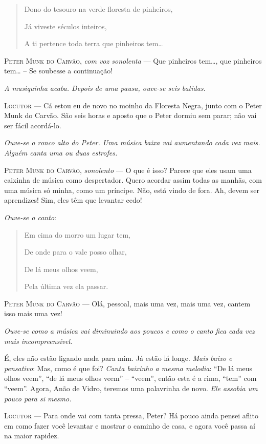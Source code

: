 \begin{myparindent}{0pt}
\begin{Parskip}
\begin{quote}
Dono do tesouro na verde floresta de pinheiros,

Já viveste séculos inteiros,

A ti pertence toda terra que pinheiros tem\ldots{}
\end{quote}

\textsc{Peter Munk do Carvão}, \emph{com voz sonolenta} --- Que pinheiros
tem\ldots{}, que pinheiros tem\ldots{} -- Se soubesse a continuação!

\emph{A musiquinha acaba. Depois de uma pausa, ouve-se seis batidas.}

\textsc{Locutor} --- Cá estou eu de novo no moinho da Floresta Negra, junto com o
Peter Munk do Carvão. São seis horas e aposto que o Peter dormiu sem
parar; não vai ser fácil acordá-lo.

\emph{Ouve-se o ronco alto do Peter. Uma música baixa vai aumentando
cada vez mais. Alguém canta uma ou duas estrofes.}

\textsc{Peter Munk do Carvão}, \emph{sonolento} --- O que é isso? Parece que eles
usam uma caixinha de música como despertador. Quero acordar assim todas
as manhãs, com uma música só minha, como um príncipe. Não, está vindo de
fora. Ah, devem ser aprendizes! Sim, eles têm que levantar cedo!

\emph{Ouve-se o canto}:

\begin{quote}
Em cima do morro um lugar tem,

De onde para o vale posso olhar,

De lá meus olhos veem,

Pela última vez ela passar.
\end{quote}

\textsc{Peter Munk do Carvão} --- Olá, pessoal, mais uma vez, mais uma vez, cantem
isso mais uma vez!

\emph{Ouve-se como a música vai diminuindo aos poucos e como o canto
fica cada vez mais incompreensível.}

É, eles não estão ligando nada para mim. Já estão lá longe. \emph{Mais
baixo e pensativo}: Mas, como é que foi? \emph{Canta baixinho a mesma
melodia}: ``De lá meus olhos veem'', ``de lá meus olhos veem'' --
``veem'', então esta é a rima, ``tem'' com ``veem''. Agora, Anão de
Vidro, teremos uma palavrinha de novo. \emph{Ele assobia um pouco para
si mesmo.}

\textsc{Locutor} --- Para onde vai com tanta pressa, Peter? Há pouco ainda pensei
aflito em como fazer você levantar e mostrar o caminho de casa, e agora
você passa aí na maior rapidez.


\end{Parskip}
\end{myparindent}
